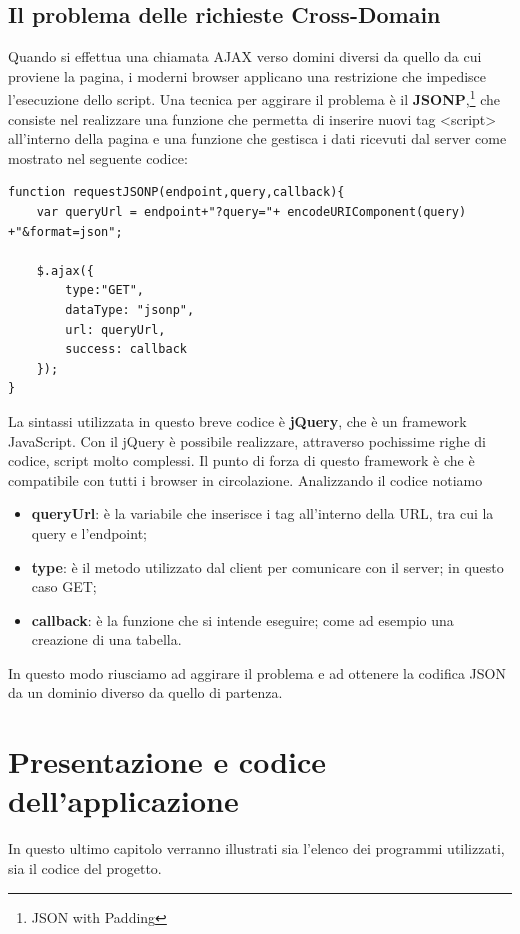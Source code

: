 \documentclass[a4paper,11pt]{article}
\begin{document}
\subsection{Il problema delle richieste Cross-Domain}
\label{sec:5.4}
Quando si effettua una chiamata AJAX verso domini diversi da quello da cui proviene la pagina, i moderni browser applicano una restrizione che impedisce l'esecuzione dello script.
Una tecnica per aggirare il problema è il \textbf{JSONP},\footnote{JSON with Padding} che consiste nel realizzare una funzione che permetta di inserire nuovi tag <script> all'interno della pagina e una funzione che gestisca i dati ricevuti dal server come mostrato nel seguente codice:

\begin{lstlisting}[style=htmlcssjs]
function requestJSONP(endpoint,query,callback){
	var queryUrl = endpoint+"?query="+ encodeURIComponent(query) +"&format=json";
	
	$.ajax({
       	type:"GET",
       	dataType: "jsonp",  
        url: queryUrl,
        success: callback
    });
}
\end{lstlisting}
La sintassi utilizzata in questo breve codice è \textbf{jQuery}, che è un framework JavaScript.
Con il jQuery è possibile realizzare, attraverso pochissime righe di codice, script molto complessi. Il punto di forza di questo framework è che è compatibile con tutti i browser in circolazione. \newline
Analizzando il codice notiamo
\begin{itemize}
\item \textbf{queryUrl}: è la variabile che inserisce i tag all'interno della URL, tra cui la query e l'endpoint;
\item \textbf{type}: è il metodo utilizzato dal client per comunicare con il server; in questo caso GET;
\item \textbf{callback}: è la funzione che si intende eseguire; come ad esempio una creazione di una tabella.
\end{itemize}

In questo modo riusciamo ad aggirare il problema e ad ottenere la codifica JSON da un dominio diverso da quello di partenza.
\newpage
\section{Presentazione e codice dell'applicazione}
\label{sec:6}
In questo ultimo capitolo verranno illustrati sia l'elenco dei programmi utilizzati, sia il codice del progetto.
\end{document}
